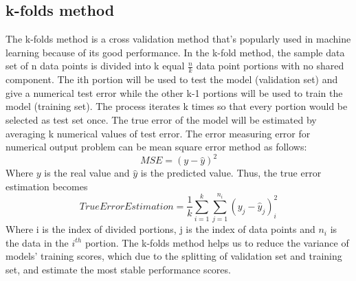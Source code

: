 \subsection*{k-folds method}
The k-folds method is a cross validation method that’s popularly used in 
machine learning because of its good performance. In the k-fold method, 
the sample data set of n data points is divided into k equal $\frac{n}{k}$ data point 
portions with no shared component. The ith portion will be used to test the 
model (validation set) and give a numerical test error while the other k-1 
portions will be used to train the model (training set). The process iterates 
k times so that every portion would be selected as test set once. The true 
error of the model will be estimated by averaging k numerical values of test 
error. The error measuring error for numerical output problem can be mean 
square error method as follows:
\begin{equation}
    M S E=(y-\hat{y})^{2}
\end{equation}
Where $y$ is the real value and $\hat{y}$ is the predicted value. Thus, the 
true error estimation becomes
\begin{equation}
    True Error Estimation=\frac{1}{k} \sum_{i=1}^{k} \sum_{j=1}^{n_i}\left(y_{j}-\hat{y}_{j}\right)_{i}^{2}
\end{equation}
Where i is the index of divided portions, j is the index of data points and 
$n_i$ is the data in the $i^{th}$ portion. The k-folds method helps us to 
reduce the variance of models’ training scores, which due to the splitting of 
validation set and training set, and estimate the most stable performance scores.